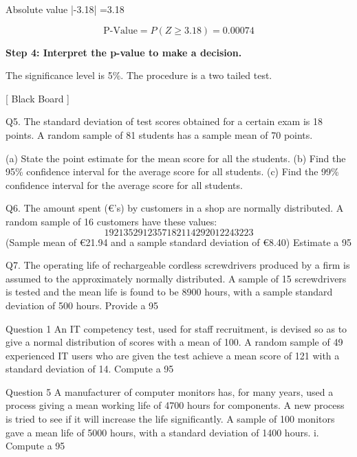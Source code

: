 Absolute value  |-3.18| =3.18




\[ \mbox{P-Value} = P(Z \geq 3.18) = 0.00074\]


\noindent \textbf{Step 4: Interpret the p-value to make a decision.}

The significance level is 5\%.  The procedure is a two tailed test.


[ Black Board ]

\newpage
Q5. The standard deviation of test scores obtained for a certain exam is 18 points. 
A random sample of 81 students has a sample mean of 70 points.

(a) State the point estimate for the mean score for all the students.
(b) Find the 95\% confidence interval for the average score for all students.
(c) Find the 99\% confidence interval for the average score for all students.

Q6. The amount spent (€’s) by customers in a shop are normally distributed. 
A random sample of 16 customers have these values:
\[19 21 35 29 12 35 7 18 21 14 29 20 12 24 32 23\]
(Sample  mean of €21.94 and a sample standard deviation of €8.40) 
Estimate a 95%

Q7. The operating life of rechargeable cordless screwdrivers produced by a firm is assumed to 
the approximately normally distributed. A sample of 15 screwdrivers is tested and the mean 
life is found to be 8900 hours, with a sample standard deviation of 500 hours. 
Provide a 95%


Question 1 
An IT competency test, used for staff recruitment, is devised so as to give a normal distribution of scores with a mean of 100. A random sample of 49 experienced IT users who are given the test achieve a mean score of 121 with a standard deviation of 14. 
Compute a 95%

\newpage

Question 5
A manufacturer of computer monitors  has, for many years, used a process giving a mean  working life of 4700 hours  for components.
A new process is tried to see if it will increase the life significantly. A sample of 100 monitors gave a mean life of 5000 hours, with a standard deviation of 1400 hours.
i.	Compute a 95%



\newpage

